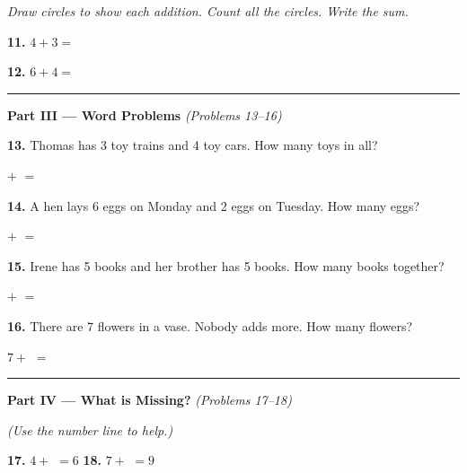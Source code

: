 \documentclass[12pt, letterpaper]{article}
\newcommand{\numbox}{\fbox{\hspace{0.6cm}\vphantom{0}}}
\begin{document}
\medskip\noindent\textit{Draw circles to show each addition. Count all the circles. Write the sum.}

\bigskip
\noindent\textbf{11.} $4 + 3 =$ \numbox

\medskip
{}

\bigskip
\noindent\textbf{12.} $6 + 4 =$ \numbox

\medskip
{}

\bigskip
\noindent\textcolor{scholared}{\rule{\linewidth}{0.4pt}}

\noindent\textcolor{scholared}{\large\textbf{Part III — Word Problems}} \hfill \textit{(Problems 13–16)}

\bigskip
\noindent\textbf{13.} Thomas has 3 toy trains and 4 toy cars. How many toys in all?

\medskip
\hspace{2em} \numbox \; $+$ \; \numbox \; $=$ \; \numbox

\bigskip
\noindent\textbf{14.} A hen lays 6 eggs on Monday and 2 eggs on Tuesday. How many eggs?

\medskip
\hspace{2em} \numbox \; $+$ \; \numbox \; $=$ \; \numbox

\bigskip
\noindent\textbf{15.} Irene has 5 books and her brother has 5 books. How many books together?

\medskip
\hspace{2em} \numbox \; $+$ \; \numbox \; $=$ \; \numbox

\bigskip
\noindent\textbf{16.} There are 7 flowers in a vase. Nobody adds more. How many flowers?

\medskip
\hspace{2em} $7 + $ \numbox \; $=$ \; \numbox

\bigskip
\noindent\textcolor{scholared}{\rule{\linewidth}{0.4pt}}

\noindent\textcolor{scholared}{\large\textbf{Part IV — What is Missing?}} \hfill \textit{(Problems 17–18)}

\medskip\noindent\textit{(Use the number line to help.)}

\bigskip
\noindent\textbf{17.} $4 + $ \numbox $= 6$ \hspace{2cm} \textbf{18.} $7 + $ \numbox $= 9$

\bigskip

\begin{center}
\end{center}
\end{document}
